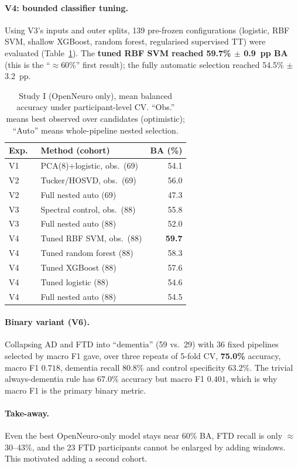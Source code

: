 \documentclass[10pt,twocolumn,a4paper]{article}
\begin{document}
\paragraph{V4: bounded classifier tuning.} Using V3's inputs and outer splits, 139 pre-frozen configurations (logistic, RBF SVM, shallow XGBoost, random forest, regularised supervised TT) were evaluated (Table~\ref{tab:study1}). The \textbf{tuned RBF SVM reached 59.7\% $\pm$ 0.9~pp BA} (this is the ``$\approx$60\%'' first result); the fully automatic selection reached 54.5\% $\pm$ 3.2~pp.

\begin{table}[t]
\centering\small
\caption{Study I (OpenNeuro only), mean balanced accuracy under participant-level CV. ``Obs.'' means best observed over candidates (optimistic); ``Auto'' means whole-pipeline nested selection.}
\label{tab:study1}
\begin{tabular}{@{}llr@{}}
\toprule
Exp.\ & Method (cohort) & BA (\%)\\
\midrule
V1 & PCA(8)+logistic, obs.\ (69) & 54.1\\
V2 & Tucker/HOSVD, obs.\ (69) & 56.0\\
V2 & Full nested auto (69) & 47.3\\
V3 & Spectral control, obs.\ (88) & 55.8\\
V3 & Full nested auto (88) & 52.0\\
V4 & Tuned RBF SVM, obs.\ (88) & \textbf{59.7}\\
V4 & Tuned random forest (88) & 58.3\\
V4 & Tuned XGBoost (88) & 57.6\\
V4 & Tuned logistic (88) & 54.6\\
V4 & Full nested auto (88) & 54.5\\
\bottomrule
\end{tabular}
\end{table}

\paragraph{Binary variant (V6).} Collapsing AD and FTD into ``dementia'' (59 vs.\ 29) with 36 fixed pipelines selected by macro F1 gave, over three repeats of 5-fold CV, \textbf{75.0\%} accuracy, macro F1 $0.718$, dementia recall $80.8\%$ and control specificity $63.2\%$. The trivial always-dementia rule has $67.0\%$ accuracy but macro F1 $0.401$, which is why macro F1 is the primary binary metric.

\paragraph{Take-away.} Even the best OpenNeuro-only model stays near 60\% BA, FTD recall is only $\approx$30--43\%, and the 23 FTD participants cannot be enlarged by adding windows. This motivated adding a second cohort.
\end{document}

